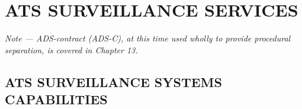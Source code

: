 \documentclass[../main.tex]{subfiles}
\begin{document}
    \setcounter{figure}{0}
    
    \thispagestyle{1page}

    \section[ATS Surveillance Services]{ATS SURVEILLANCE SERVICES}

    \begin{enumempty}[labelindent=\parindent]
        \item \textit{Note --- ADS-contract (ADS-C), at this time used wholly to provide procedural separation, is covered in Chapter 13.}
    \end{enumempty}

    \subsection[ATS surveillance systems capabilities]{ATS SURVEILLANCE SYSTEMS CAPABILITIES}
\end{document}
